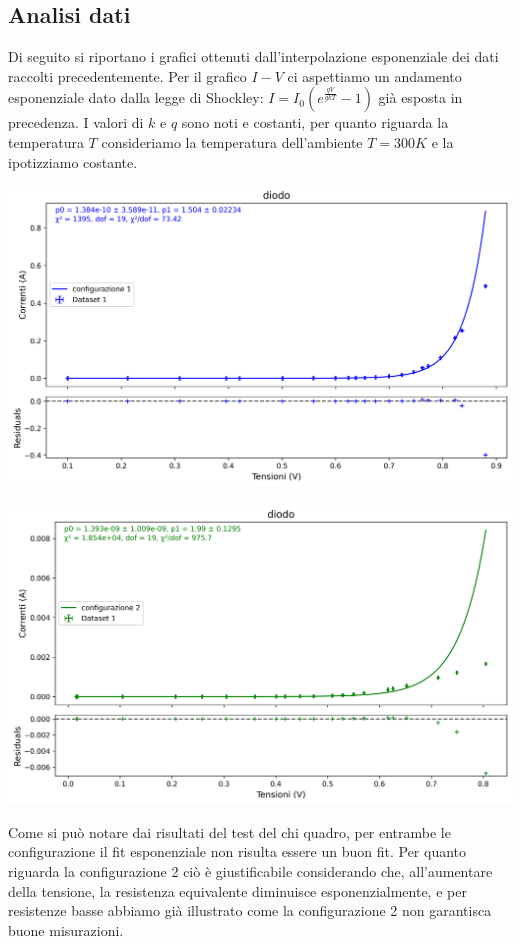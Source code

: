 \documentclass[a4paper]{article}
\begin{document}
\subsection{Analisi dati}
Di seguito si riportano i grafici ottenuti dall'interpolazione esponenziale dei dati raccolti precedentemente. Per il grafico  \(I-V\) ci aspettiamo un andamento esponenziale dato dalla legge di Shockley:  \(I = I_0 \left( e^{\frac{qV}{gkT}} - 1 \right)\) già esposta in precedenza. I valori di \( k \) e \( q \) sono noti e costanti, per quanto riguarda la temperatura \( T \) consideriamo la temperatura dell'ambiente  \(T=300K\) e la ipotizziamo costante. 
\begin{center}
    \includegraphics[width=0.75\linewidth]{grafici/diodo_1.png}
    \label{fig:diodo 1}
\end{center}
\begin{center}
    \centering
    \includegraphics[width=0.75\linewidth]{grafici/diodo_2.png}
    \label{fig:diodo 2}
\end{center}
Come si può notare dai risultati del test del chi quadro, per entrambe le configurazione il fit esponenziale non risulta essere un buon fit.
Per quanto riguarda la configurazione 2 ciò è giustificabile considerando che,          all'aumentare della tensione, la resistenza equivalente diminuisce esponenzialmente, e per resistenze basse abbiamo già illustrato come la configurazione 2 non garantisca buone misurazioni. 
\end{document}
